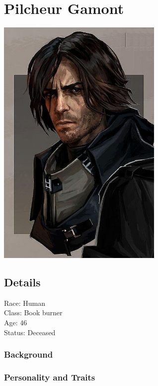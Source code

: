\section{Pilcheur Gamont}

\begin{center}
\includegraphics[width=80mm]{./content/img/pilch1.jpg}
\begin{figure}[h]
\end{figure}
\end{center}

\subsection*{Details} 

\noindent

Race: 	Human \\
Class: 	Book burner \\
Age: 	46 \\
Status: Deceased

\subsubsection*{Background}


\subsubsection{Personality and Traits}



